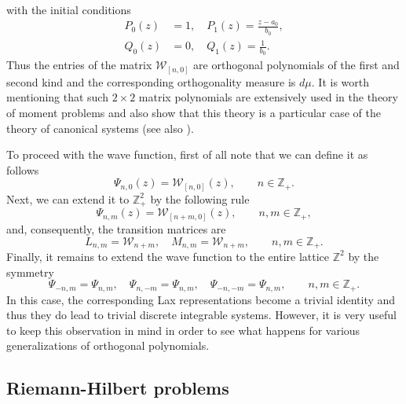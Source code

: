 \documentclass{amsart}
\theoremstyle{remark}
\numberwithin{equation}{section}
\begin{document}
with the initial conditions
\begin{equation*}\label{DiffEq}
 \begin{split}
    P_0(z)&=1,\quad P_1(z)=\frac{z-a_0}{b_0},\\
     Q_0(z)&=0,\quad Q_1(z)=\frac{1}{b_0}.
\end{split}
\end{equation*}
Thus the entries of the matrix ${{\mathcal W}}_{[n,0]}$ are orthogonal polynomials of the first and second kind and the corresponding
orthogonality measure is $d\mu$. It is worth mentioning that such $2\times 2$ matrix polynomials are extensively used in the theory of moment problems \cite{Ach1961} and  also show that this theory is a particular case of the theory of canonical systems \cite[Chapter 8]{Sakh1997} (see also \cite{Sakh1999}).

To proceed with the wave function, first of all note that we can define it as follows
\[
\Psi_{n,0}(z)={{\mathcal W}}_{[n,0]}(z), \qquad n\in{{\mathbb Z}}_+.
\]
Next, we can extend it to ${{\mathbb Z}}^2_+$ by the following rule
\[
\Psi_{n,m}(z)={{\mathcal W}}_{[n+m,0]}(z), \qquad n,m\in{{\mathbb Z}}_+,
\]
and, consequently, the transition matrices are
\[
L_{n,m}={{\mathcal W}}_{n+m},\quad M_{n,m}={{\mathcal W}}_{n+m}, \qquad n,m\in{{\mathbb Z}}_+.
\]
Finally, it remains to extend the wave function to the entire lattice ${{\mathbb Z}}^2$ by the symmetry
\begin{equation}\label{SymW}
\Psi_{-n,m}=\Psi_{n,m}, \quad \Psi_{n,-m}=\Psi_{n,m},\quad \Psi_{-n,-m}=\Psi_{n,m}, \qquad n,m\in{{\mathbb Z}}_+.
\end{equation}
In this case, the corresponding Lax representations become a trivial identity and thus they do lead to
trivial discrete integrable systems. However, it is very useful to keep this observation in mind in order to see what happens for various generalizations of orthogonal polynomials.

\subsection{Riemann-Hilbert problems}\label{sec:32}
\end{document}
